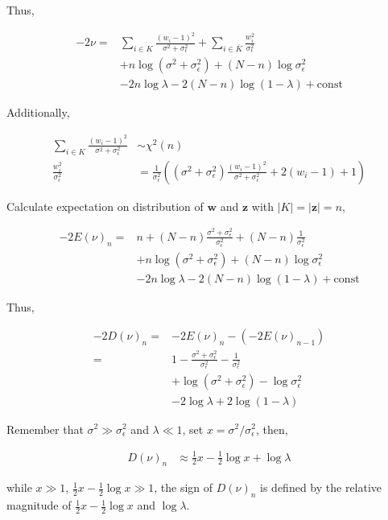 \documentclass[notitlepage]{article}
\begin{document}
Thus, 

\begin{align}
    -2\nu =& \sum_{i\in K}\frac{(w_i - 1)^2}{\sigma^2+\sigma_\epsilon^2} + \sum_{i\in \bar{K}}\frac{w_i^2}{\sigma_\epsilon^2} \\ 
    &+ n\log(\sigma^2+\sigma_\epsilon^2) + (N-n)\log\sigma_\epsilon^2 \\
    &- 2n\log\lambda - 2(N-n)\log(1-\lambda) + \mathrm{const}
\end{align}

Additionally, 

\begin{align}
    \sum_{i\in K}\frac{(w_i - 1)^2}{\sigma^2+\sigma_\epsilon^2} &\sim \chi^2(n) \\
    \frac{w_i^2}{\sigma_\epsilon^2} &= \frac{1}{\sigma_\epsilon^2}((\sigma^2+\sigma_\epsilon^2)\frac{(w_i - 1)^2}{\sigma^2+\sigma_\epsilon^2} + 2(w_i - 1) + 1)
\end{align}

Calculate expectation on distribution of $\bm{w}$ and $\bm{z}$ with $|K|=|\bm{z}|=n$, 

\begin{align}
    -2E(\nu)_n =& n + (N - n)\frac{\sigma^2+\sigma_\epsilon^2}{\sigma_\epsilon^2} + (N - n)\frac{1}{\sigma_\epsilon^2} \\ 
    &+ n\log(\sigma^2+\sigma_\epsilon^2) + (N-n)\log\sigma_\epsilon^2 \\
    &- 2n\log\lambda - 2(N-n)\log(1-\lambda) + \mathrm{const}
\end{align}

Thus, 

\begin{align}
    -2D(\nu)_n =& -2E(\nu)_n - (-2E(\nu)_{n-1}) \\ 
    =& 1 - \frac{\sigma^2+\sigma_\epsilon^2}{\sigma_\epsilon^2} - \frac{1}{\sigma_\epsilon^2} \\
    &+ \log(\sigma^2+\sigma_\epsilon^2) - \log\sigma_\epsilon^2 \\
    &- 2\log\lambda + 2\log(1-\lambda)
\end{align}

Remember that $\sigma^2 \gg \sigma_\epsilon^2$ and $\lambda \ll 1$, set $x=\sigma^2/\sigma_\epsilon^2$, then,

\begin{align}
    D(\nu)_n &\approx \frac{1}{2}x - \frac{1}{2}\log x + \log\lambda
\end{align}

while $x \gg 1$, $\frac{1}{2}x - \frac{1}{2}\log x \gg 1$, the sign of $D(\nu)_n$ is defined by the relative magnitude of $\frac{1}{2}x - \frac{1}{2}\log x$ and $\log\lambda$. 
\end{document}
